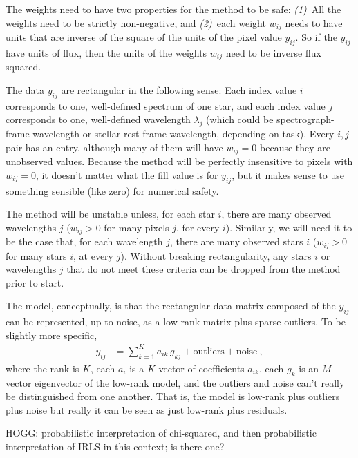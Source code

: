 \documentclass{article}
\begin{document}
The weights need to have two properties for the method to be safe:
\textsl{(1)}~All the weights need to be strictly non-negative, and
\textsl{(2)}~each weight $w_{ij}$ needs to have units that are inverse of the square of the units of the pixel value $y_{ij}$.
So if the $y_{ij}$ have units of flux, then the units of the weights $w_{ij}$ need to be inverse flux squared.

The data $y_{ij}$ are rectangular in the following sense:
Each index value $i$ corresponds to one, well-defined spectrum of one star, and
each index value $j$ corresponds to one, well-defined wavelength $\lambda_j$ (which could be spectrograph-frame wavelength or stellar rest-frame wavelength, depending on task).
Every $i,j$ pair has an entry, although many of them will have $w_{ij}=0$ because they are unobserved values.
Because the method will be perfectly insensitive to pixels with $w_{ij}=0$, it doesn't matter what the fill value is for $y_{ij}$, but it makes sense to use something sensible (like zero) for numerical safety.

The method will be unstable unless, for each star $i$, there are many observed wavelengths $j$ ($w_{ij} > 0$ for many pixels $j$, for every $i$).
Similarly, we will need it to be the case that, for each wavelength $j$, there are many observed stars $i$ ($w_{ij} > 0$ for many stars $i$, at every $j$).
Without breaking rectangularity, any stars $i$ or wavelengths $j$ that do not meet these criteria can be dropped from the method prior to start.

The model, conceptually, is that the rectangular data matrix composed of the $y_{ij}$ can be represented, up to noise, as a low-rank matrix plus sparse outliers.
To be slightly more specific,
\begin{align}
    y_{ij} &= \sum_{k=1}^K a_{ik}\,g_{kj} + \text{outliers} + \text{noise} \label{eq:model}~,
\end{align}
where the rank is $K$,
each $a_i$ is a $K$-vector of coefficients $a_{ik}$,
each $g_k$ is an $M$-vector eigenvector of the low-rank model,
and the outliers and noise can't really be distinguished from one another.
That is, the model is low-rank plus outliers plus noise but really it can be seen as just low-rank plus residuals.

HOGG: probabilistic interpretation of chi-squared, and then probabilistic interpretation of IRLS in this context; is there one?
\end{document}
